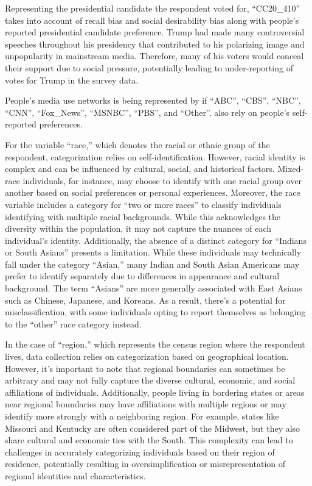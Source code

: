 \documentclass[
  letterpaper,
  DIV=11,
  numbers=noendperiod]{scrartcl}
\begin{document}
Representing the presidential candidate the respondent voted for,
``CC20\_410'' takes into account of recall bias and social desirability
bias along with people's reported presidential candidate preference.
Trump had made many controversial speeches throughout his presidency
that contributed to his polarizing image and unpopularity in mainstream
media. Therefore, many of his voters would conceal their support due to
social pressure, potentially leading to under-reporting of votes for
Trump in the survey data.

People's media use networks is being represented by if ``ABC'', ``CBS'',
``NBC'', ``CNN'', ``Fox\_News'', ``MSNBC'', ``PBS'', and ``Other''. also
rely on people's self-reported preferences.

For the variable ``race,'' which denotes the racial or ethnic group of
the respondent, categorization relies on self-identification. However,
racial identity is complex and can be influenced by cultural, social,
and historical factors. Mixed-race individuals, for instance, may choose
to identify with one racial group over another based on social
preferences or personal experiences. Moreover, the race variable
includes a category for ``two or more races'' to classify individuals
identifying with multiple racial backgrounds. While this acknowledges
the diversity within the population, it may not capture the nuances of
each individual's identity. Additionally, the absence of a distinct
category for ``Indians or South Asians'' presents a limitation. While
these individuals may technically fall under the category ``Asian,''
many Indian and South Asian Americans may prefer to identify separately
due to differences in appearance and cultural background. The term
``Asians'' are more generally associated with East Asians such as
Chinese, Japanese, and Koreans. As a result, there's a potential for
misclassification, with some individuals opting to report themselves as
belonging to the ``other'' race category instead.

In the case of ``region,'' which represents the census region where the
respondent lives, data collection relies on categorization based on
geographical location. However, it's important to note that regional
boundaries can sometimes be arbitrary and may not fully capture the
diverse cultural, economic, and social affiliations of individuals.
Additionally, people living in bordering states or areas near regional
boundaries may have affiliations with multiple regions or may identify
more strongly with a neighboring region. For example, states like
Missouri and Kentucky are often considered part of the Midwest, but they
also share cultural and economic ties with the South. This complexity
can lead to challenges in accurately categorizing individuals based on
their region of residence, potentially resulting in oversimplification
or misrepresentation of regional identities and characteristics.
\end{document}
